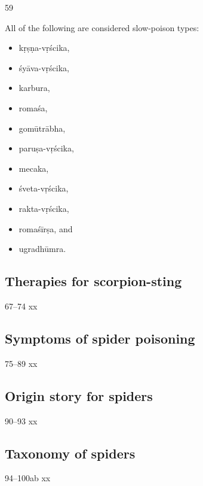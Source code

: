 \begin{translation}
\item [59]

All of the following are considered slow-poison types:
\begin{itemize}
    \item \Gls{kṛṣṇa-vṛścika},
    \item \Gls{śyāva-vṛścika},
    \item \Gls{karbura},
    \item \Gls{romaśa},
    \item \Gls{gomūtrābha},
    \item \Gls{paruṣa-vṛścika},
    \item \Gls{mecaka},
    \item \Gls{śveta-vṛścika},
    \item \Gls{rakta-vṛścika},
    \item \Gls{romaśīrṣa}, and
    \item \Gls{ugradhūmra}.
    
\end{itemize}


 
 
 
 \subsection{Therapies for scorpion-sting}
 
 \item[67--74] xx
 
 \subsection{Symptoms of spider poisoning}
 
 \item[75--89] xx
 
 \subsection{Origin story for spiders}
 
 \item[90--93] xx
 
 \subsection{Taxonomy of spiders}
 
 \item[94--100ab] xx
 

\end{translation}

